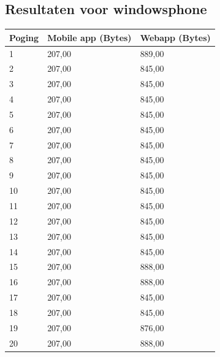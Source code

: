 \documentclass[pdftex,a4paper,12pt,twoside]{report}
\begin{document}
\subsection{Resultaten voor windowsphone}
\begin{center}
  \begin{tabular}{ | l | l | l |}
      \hline
      Poging & Mobile app (Bytes) & Webapp (Bytes)
      \\ \hline
      1 & 207,00 & 889,00
      \\ \hline
      2 & 207,00 & 845,00
      \\ \hline
      3 & 207,00 & 845,00
      \\ \hline
      4 & 207,00 & 845,00
      \\ \hline
      5 & 207,00 & 845,00
      \\ \hline
      6 & 207,00 & 845,00
      \\ \hline
      7 & 207,00 & 845,00
      \\ \hline
      8 & 207,00 & 845,00
      \\ \hline
      9 & 207,00 & 845,00
      \\ \hline
      10 & 207,00 & 845,00
      \\ \hline
      11 & 207,00 & 845,00
      \\ \hline
      12 & 207,00 & 845,00
      \\ \hline
      13 & 207,00 & 845,00
      \\ \hline
      14 & 207,00 & 845,00
      \\ \hline
      15 & 207,00 & 888,00
      \\ \hline
      16 & 207,00 & 888,00
      \\ \hline
      17 & 207,00 & 845,00
      \\ \hline
      18 & 207,00 & 845,00
      \\ \hline
      19 & 207,00 & 876,00
      \\ \hline
      20 & 207,00 & 888,00
      \\ \hline
  \end{tabular}
\end{center}
\end{document}

